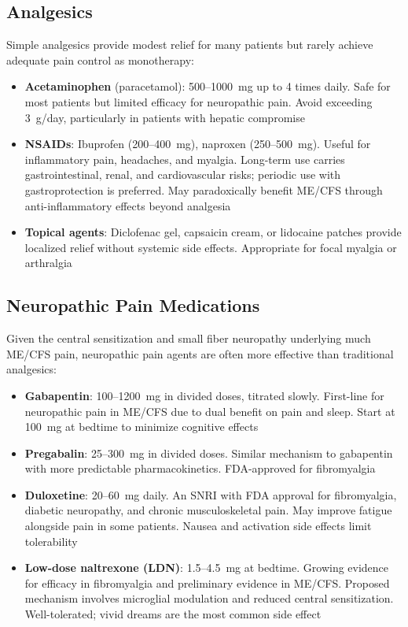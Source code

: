 \subsection{Analgesics}

Simple analgesics provide modest relief for many patients but rarely achieve adequate pain control as monotherapy:

\begin{itemize}
    \item \textbf{Acetaminophen} (paracetamol): 500--1000~mg up to 4 times daily. Safe for most patients but limited efficacy for neuropathic pain. Avoid exceeding 3~g/day, particularly in patients with hepatic compromise
    \item \textbf{NSAIDs}: Ibuprofen (200--400~mg), naproxen (250--500~mg). Useful for inflammatory pain, headaches, and myalgia. Long-term use carries gastrointestinal, renal, and cardiovascular risks; periodic use with gastroprotection is preferred. May paradoxically benefit ME/CFS through anti-inflammatory effects beyond analgesia
    \item \textbf{Topical agents}: Diclofenac gel, capsaicin cream, or lidocaine patches provide localized relief without systemic side effects. Appropriate for focal myalgia or arthralgia
\end{itemize}

\subsection{Neuropathic Pain Medications}

Given the central sensitization and small fiber neuropathy underlying much ME/CFS pain, neuropathic pain agents are often more effective than traditional analgesics:

\begin{itemize}
    \item \textbf{Gabapentin}: 100--1200~mg in divided doses, titrated slowly. First-line for neuropathic pain in ME/CFS due to dual benefit on pain and sleep. Start at 100~mg at bedtime to minimize cognitive effects
    \item \textbf{Pregabalin}: 25--300~mg in divided doses. Similar mechanism to gabapentin with more predictable pharmacokinetics. FDA-approved for fibromyalgia
    \item \textbf{Duloxetine}: 20--60~mg daily. An SNRI with FDA approval for fibromyalgia, diabetic neuropathy, and chronic musculoskeletal pain. May improve fatigue alongside pain in some patients. Nausea and activation side effects limit tolerability
    \item \textbf{Low-dose naltrexone (LDN)}: 1.5--4.5~mg at bedtime. Growing evidence for efficacy in fibromyalgia and preliminary evidence in ME/CFS. Proposed mechanism involves microglial modulation and reduced central sensitization. Well-tolerated; vivid dreams are the most common side effect
\end{itemize}

